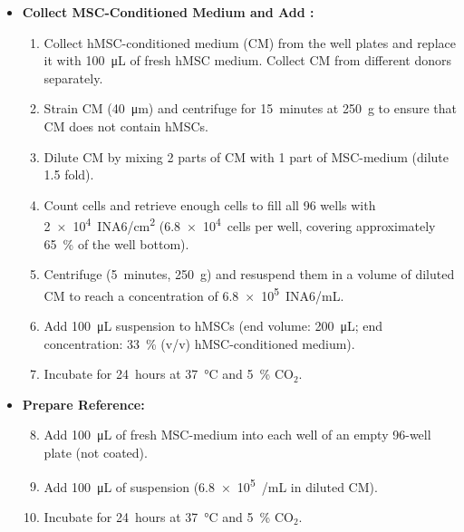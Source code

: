 \begin{itemize}
    \item \textbf{Collect MSC-Conditioned Medium and Add \INA:}
          \begin{enumerate}
              \item Collect hMSC-conditioned medium (CM) from the well plates and replace it with \SI{100}{\micro\liter} of fresh hMSC medium. Collect CM from different donors separately.
              \item Strain CM (\SI{40}{\micro\meter}) and centrifuge for \SI{15}{minutes} at \SI{250}{g} to ensure that CM does not contain hMSCs.
              \item Dilute CM by mixing 2 parts of CM with 1 part of MSC-medium (dilute 1.5 fold).
              \item Count \INA cells and retrieve enough cells to fill all 96 wells with \SI{2e4}{INA6/cm^2} (\SI{6.8e4}{cells} per well, covering approximately \SI{65}{\percent} of the well bottom).
              \item Centrifuge \INA (\SI{5}{minutes}, \SI{250}{g}) and resuspend them in a volume of diluted CM to reach a concentration of \SI{6.8e5}{INA6/mL}.
              \item Add \SI{100}{\micro\liter} \INA suspension to hMSCs (end volume: \SI{200}{\micro\liter}; end concentration: \SI{33}{\percent} (v/v) hMSC-conditioned medium).
              \item Incubate for \SI{24}{hours} at \SI{37}{\degreeCelsius} and \SI{5}{\percent} CO$_2$.
          \end{enumerate}

    \item \textbf{Prepare \CMina Reference:}
          \begin{enumerate}
              \setcounter{enumi}{7}
              \item Add \SI{100}{\micro\liter} of fresh MSC-medium into each well of an empty 96-well plate (not coated).
              \item Add \SI{100}{\micro\liter} of \INA suspension (\SI{6.8e5}{\INA/mL} in diluted CM).
              \item Incubate for \SI{24}{hours} at \SI{37}{\degreeCelsius} and \SI{5}{\percent} CO$_2$.
          \end{enumerate}


\end{itemize}
